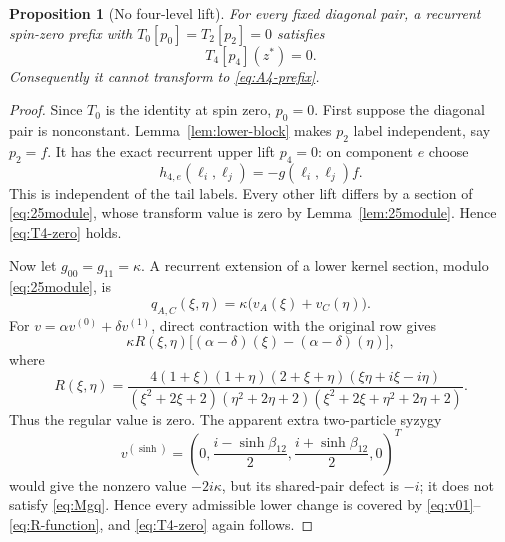 \documentclass[11pt,reqno]{amsart}
\newtheorem{proposition}[theorem]{Proposition}
\theoremstyle{definition}
\theoremstyle{remark}
\begin{document}
\begin{proposition}[No four-level lift]
\label{prop:no-prefix-lift}
For every fixed diagonal pair, a recurrent spin-zero prefix with
$T_0[p_0]=T_2[p_2]=0$ satisfies
\begin{equation}
 T_4[p_4](z^*)=0.
 \label{eq:T4-zero}
\end{equation}
Consequently it cannot transform to \eqref{eq:A4-prefix}.
\end{proposition}

\begin{proof}
Since $T_0$ is the identity at spin zero, $p_0=0$.  First suppose the diagonal
pair is nonconstant.  Lemma~\ref{lem:lower-block} makes $p_2$ label
independent, say $p_2=f$.  It has the exact recurrent upper lift $p_4=0$:
on component $e$ choose
\begin{equation}
 h_{4,e}(\ell_i,\ell_j)=-g(\ell_i,\ell_j)f.
 \label{eq:zero-lift}
\end{equation}
This is independent of the tail labels.  Every other lift differs by a section
of \eqref{eq:25module}, whose transform value is zero by
Lemma~\ref{lem:25module}.  Hence \eqref{eq:T4-zero} holds.

Now let $g_{00}=g_{11}=\kappa$.  A recurrent extension of a lower kernel
section, modulo \eqref{eq:25module}, is
\begin{equation}
 q_{A,C}(\xi,\eta)=\kappa\bigl(v_A(\xi)+v_C(\eta)\bigr).
 \label{eq:lower-extension}
\end{equation}
For $v=\alpha v^{(0)}+\delta v^{(1)}$, direct contraction with the original
row gives
\begin{equation}
 \kappa R(\xi,\eta)
 \bigl[(\alpha-\delta)(\xi)-(\alpha-\delta)(\eta)\bigr],
 \label{eq:R-contraction}
\end{equation}
where
\begin{equation}
 R(\xi,\eta)=
 \frac{4(1+\xi)(1+\eta)(2+\xi+\eta)
 (\xi\eta+i\xi-i\eta)}
 {(\xi^2+2\xi+2)(\eta^2+2\eta+2)
 (\xi^2+2\xi+\eta^2+2\eta+2)}.
 \label{eq:R-function}
\end{equation}
Thus the regular value is zero.  The apparent extra two-particle syzygy
\begin{equation}
 v^{(\sinh)}=
 \left(0,\frac{i-\sinh\beta_{12}}2,
 \frac{i+\sinh\beta_{12}}2,0\right)^T
 \label{eq:vsinh}
\end{equation}
would give the nonzero value $-2i\kappa$, but its shared-pair defect is
$-i$; it does not satisfy \eqref{eq:Mgq}.  Hence every admissible lower change
is covered by \eqref{eq:v01}--\eqref{eq:R-function}, and
\eqref{eq:T4-zero} again follows.
\end{proof}
\end{document}
